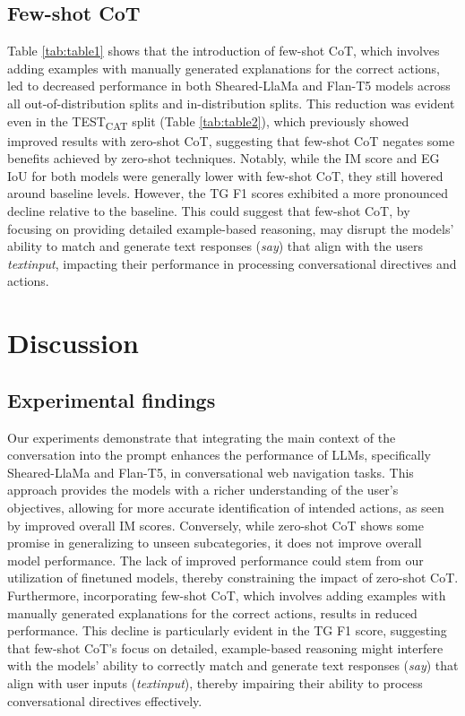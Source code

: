\documentclass[11pt]{article}
\begin{document}
\subsection{Few-shot CoT}
Table \ref{tab:table1} shows that the introduction of few-shot CoT, which involves adding examples with manually generated explanations for the correct actions, led to decreased performance in both Sheared-LlaMa and Flan-T5 models across all out-of-distribution splits and in-distribution splits. This reduction was evident even in the TEST\textsubscript{CAT} split (Table \ref{tab:table2}), which previously showed improved results with zero-shot CoT, suggesting that few-shot CoT negates some benefits achieved by zero-shot techniques. Notably, while the IM score and EG IoU for both models were generally lower with few-shot CoT, they still hovered around baseline levels. However, the TG F1 scores exhibited a more pronounced decline relative to the baseline. This could suggest that few-shot CoT, by focusing on providing detailed example-based reasoning, may disrupt the models' ability to match and generate text responses (\textit{say}) that align with the users \textit{textinput}, impacting their performance in processing conversational directives and actions.

\section{Discussion}
\subsection{Experimental findings}

Our experiments demonstrate that integrating the main context of the conversation into the prompt enhances the performance of LLMs, specifically Sheared-LlaMa and Flan-T5, in conversational web navigation tasks. This approach provides the models with a richer understanding of the user's objectives, allowing for more accurate identification of intended actions, as seen by improved overall IM scores. Conversely, while zero-shot CoT shows some promise in generalizing to unseen subcategories, it does not improve overall model performance. The lack of improved performance could stem from our utilization of finetuned models, thereby constraining the impact of zero-shot CoT. Furthermore, incorporating few-shot CoT, which involves adding examples with manually generated explanations for the correct actions, results in reduced performance. This decline is particularly evident in the TG F1 score, suggesting that few-shot CoT's focus on detailed, example-based reasoning might interfere with the models' ability to correctly match and generate text responses (\textit{say}) that align with user inputs (\textit{textinput}), thereby impairing their ability to process conversational directives effectively.
\end{document}
